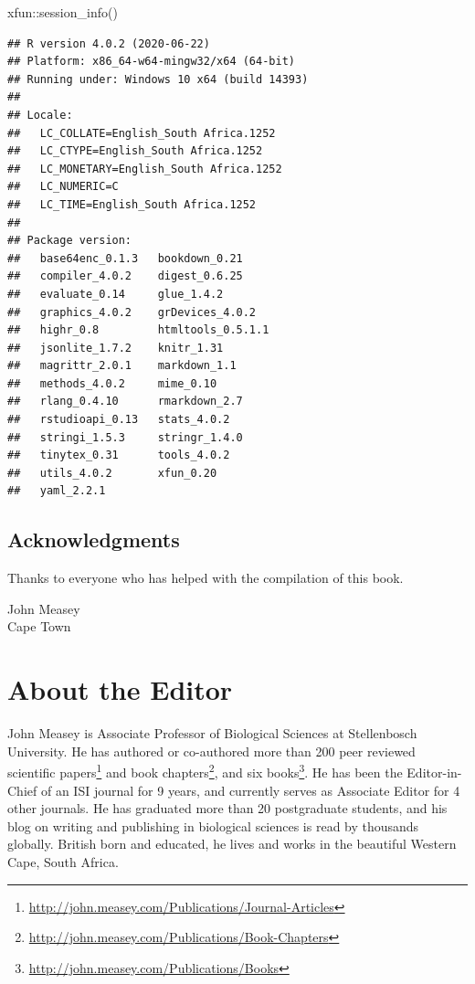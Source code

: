 \documentclass[
]{krantz}
\makeatletter
\newenvironment{Shaded}{\begin{snugshade}}{\end{snugshade}}
\newcommand{\FunctionTok}[1]{\textcolor[rgb]{0,0,0}{#1}}
\newcommand{\NormalTok}[1]{#1}
\newcommand{\SpecialCharTok}[1]{\textcolor[rgb]{0,0,0}{#1}}
\renewcommand{\href}[2]{#2\footnote{\url{#1}}}
\newenvironment{kframe}{%
\medskip{}
\setlength{\fboxsep}{.8em}
 \def\at@end@of@kframe{}%
 \ifinner\ifhmode%
  \def\at@end@of@kframe{\end{minipage}}%
  \begin{minipage}{\columnwidth}%
 \fi\fi%
 \def\FrameCommand##1{\hskip\@totalleftmargin \hskip-\fboxsep
 \colorbox{shadecolor}{##1}\hskip-\fboxsep
     \hskip-\linewidth \hskip-\@totalleftmargin \hskip\columnwidth}%
 \MakeFramed {\advance\hsize-\width
   \@totalleftmargin\z@ \linewidth\hsize
   \@setminipage}}%
 {\par\unskip\endMakeFramed%
 \at@end@of@kframe}
\renewenvironment{Shaded}{\begin{kframe}}{\end{kframe}}
\makeatother
\begin{document}
\begin{Shaded}
\begin{Highlighting}[]
\NormalTok{xfun}\SpecialCharTok{::}\FunctionTok{session\_info}\NormalTok{()}
\end{Highlighting}
\end{Shaded}

\begin{verbatim}
## R version 4.0.2 (2020-06-22)
## Platform: x86_64-w64-mingw32/x64 (64-bit)
## Running under: Windows 10 x64 (build 14393)
## 
## Locale:
##   LC_COLLATE=English_South Africa.1252 
##   LC_CTYPE=English_South Africa.1252   
##   LC_MONETARY=English_South Africa.1252
##   LC_NUMERIC=C                         
##   LC_TIME=English_South Africa.1252    
## 
## Package version:
##   base64enc_0.1.3   bookdown_0.21    
##   compiler_4.0.2    digest_0.6.25    
##   evaluate_0.14     glue_1.4.2       
##   graphics_4.0.2    grDevices_4.0.2  
##   highr_0.8         htmltools_0.5.1.1
##   jsonlite_1.7.2    knitr_1.31       
##   magrittr_2.0.1    markdown_1.1     
##   methods_4.0.2     mime_0.10        
##   rlang_0.4.10      rmarkdown_2.7    
##   rstudioapi_0.13   stats_4.0.2      
##   stringi_1.5.3     stringr_1.4.0    
##   tinytex_0.31      tools_4.0.2      
##   utils_4.0.2       xfun_0.20        
##   yaml_2.2.1
\end{verbatim}

\hypertarget{acknowledgments}{%
\section*{Acknowledgments}\label{acknowledgments}}


Thanks to everyone who has helped with the compilation of this book.

\begin{flushright}
John Measey\\
Cape Town
\end{flushright}

\hypertarget{about-the-editor}{%
\chapter*{About the Editor}\label{about-the-editor}}


John Measey is Associate Professor of Biological Sciences at Stellenbosch University. He has authored or co-authored more than \href{http://john.measey.com/Publications/Journal-Articles}{200 peer reviewed scientific papers} and \href{http://john.measey.com/Publications/Book-Chapters}{book chapters}, and \href{http://john.measey.com/Publications/Books}{six books}. He has been the Editor-in-Chief of an ISI journal for 9 years, and currently serves as Associate Editor for 4 other journals. He has graduated more than 20 postgraduate students, and his blog on writing and publishing in biological sciences is read by thousands globally. British born and educated, he lives and works in the beautiful Western Cape, South Africa.
\end{document}
